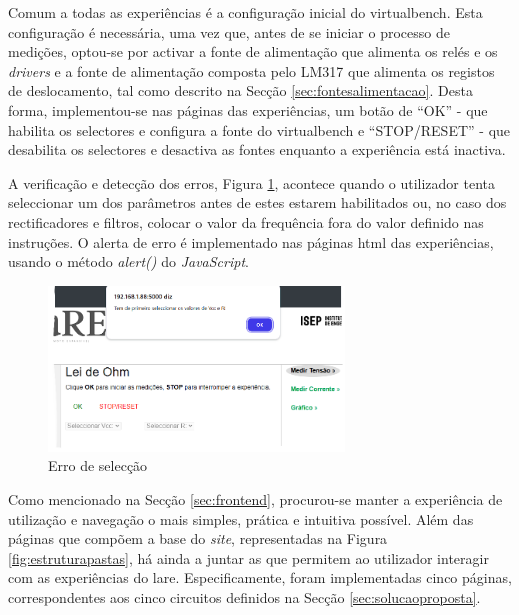
Comum a todas as experiências é a configuração inicial do \acrshort{virtualbench}. Esta configuração é necessária, uma vez que, antes de se iniciar o processo de medições, optou-se por activar a fonte de alimentação que alimenta os relés e os \textit{drivers} e a fonte de alimentação composta pelo LM317 que alimenta os registos de deslocamento, tal como descrito na Secção \ref{sec:fontesalimentacao}. Desta forma, implementou-se nas páginas das experiências, um botão de ``OK'' - que habilita os selectores e configura a fonte do \acrshort{virtualbench} e ``STOP/RESET'' - que desabilita os selectores e desactiva as fontes enquanto a experiência está inactiva. 

A verificação e detecção dos erros, Figura \ref{fig:erropagina}, acontece quando o utilizador tenta seleccionar um dos parâmetros antes de estes estarem habilitados ou, no caso dos rectificadores e filtros, colocar o valor da frequência fora do valor definido nas instruções. O alerta de erro é implementado nas páginas \acrshort{html} das experiências, usando o método \textit{alert()} do \textit{JavaScript}.

\begin{figure}[hbtp]
	\centering
	\includegraphics[width=0.7\textwidth]{figures/erro_pagina.png}
	\caption{Erro de selecção}
	\label{fig:erropagina}
\end{figure}

Como mencionado na Secção \ref{sec:frontend}, procurou-se manter a experiência de utilização e navegação o mais simples, prática e intuitiva possível. Além das páginas que compõem a base do \textit{site}, representadas na Figura \ref{fig:estruturapastas}, há ainda a juntar as que permitem ao utilizador interagir com as experiências do \acrshort{lare}. Especificamente, foram implementadas cinco páginas, correspondentes aos cinco circuitos definidos na Secção \ref{sec:solucaoproposta}.

